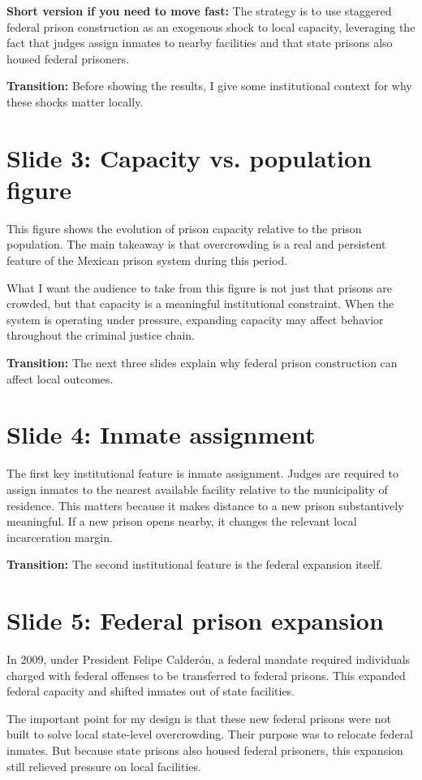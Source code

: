 \documentclass[11pt]{article}
\begin{document}
\textbf{Short version if you need to move fast:}
The strategy is to use staggered federal prison construction as an exogenous shock to local capacity, leveraging the fact that judges assign inmates to nearby facilities and that state prisons also housed federal prisoners.

\textbf{Transition:} Before showing the results, I give some institutional context for why these shocks matter locally.

\section{Slide 3: Capacity vs. population figure}
This figure shows the evolution of prison capacity relative to the prison population. The main takeaway is that overcrowding is a real and persistent feature of the Mexican prison system during this period.

What I want the audience to take from this figure is not just that prisons are crowded, but that capacity is a meaningful institutional constraint. When the system is operating under pressure, expanding capacity may affect behavior throughout the criminal justice chain.

\textbf{Transition:} The next three slides explain why federal prison construction can affect local outcomes.

\section{Slide 4: Inmate assignment}
The first key institutional feature is inmate assignment. Judges are required to assign inmates to the nearest available facility relative to the municipality of residence. This matters because it makes distance to a new prison substantively meaningful. If a new prison opens nearby, it changes the relevant local incarceration margin.

\textbf{Transition:} The second institutional feature is the federal expansion itself.

\section{Slide 5: Federal prison expansion}
In 2009, under President Felipe Calderón, a federal mandate required individuals charged with federal offenses to be transferred to federal prisons. This expanded federal capacity and shifted inmates out of state facilities.

The important point for my design is that these new federal prisons were not built to solve local state-level overcrowding. Their purpose was to relocate federal inmates. But because state prisons also housed federal prisoners, this expansion still relieved pressure on local facilities.
\end{document}
